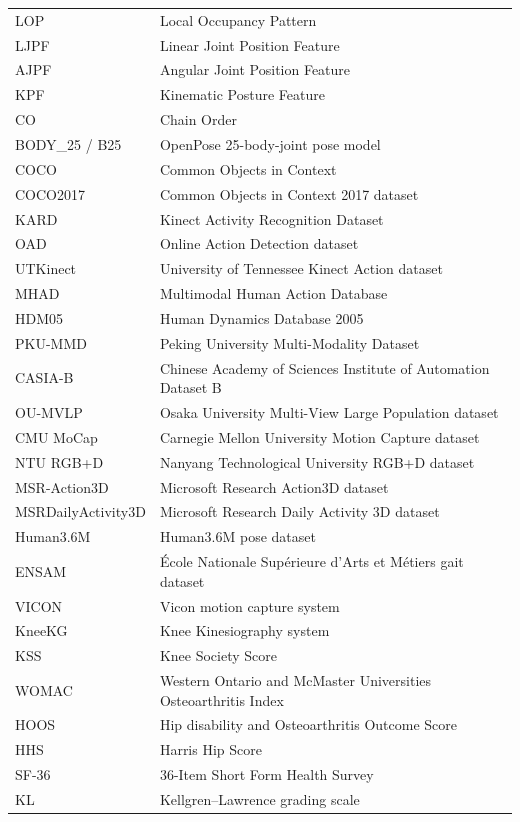 \documentclass[12pt]{elsarticle}
\begin{document}
{\begin{longtable}{p{3cm} p{10.5cm}}
LOP & Local Occupancy Pattern \\
LJPF & Linear Joint Position Feature \\
AJPF & Angular Joint Position Feature \\
KPF & Kinematic Posture Feature \\
CO & Chain Order \\
BODY\_25 / B25 & OpenPose 25-body-joint pose model \\
COCO & Common Objects in Context \\
COCO2017 & Common Objects in Context 2017 dataset \\
KARD & Kinect Activity Recognition Dataset \\
OAD & Online Action Detection dataset \\
UTKinect & University of Tennessee Kinect Action dataset \\
MHAD & Multimodal Human Action Database \\
HDM05 & Human Dynamics Database 2005 \\
PKU-MMD & Peking University Multi-Modality Dataset \\
CASIA-B & Chinese Academy of Sciences Institute of Automation Dataset B \\
OU-MVLP & Osaka University Multi-View Large Population dataset \\
CMU MoCap & Carnegie Mellon University Motion Capture dataset \\
NTU RGB+D & Nanyang Technological University RGB+D dataset \\
MSR-Action3D & Microsoft Research Action3D dataset \\
MSRDailyActivity3D & Microsoft Research Daily Activity 3D dataset \\
Human3.6M & Human3.6M pose dataset \\
ENSAM & \mbox{\'E}cole Nationale Sup\'erieure d'Arts et M\'etiers gait dataset \\
VICON & Vicon motion capture system \\
KneeKG & Knee Kinesiography system \\
KSS & Knee Society Score \\
WOMAC & Western Ontario and McMaster Universities Osteoarthritis Index \\
HOOS & Hip disability and Osteoarthritis Outcome Score \\
HHS & Harris Hip Score \\
SF-36 & 36-Item Short Form Health Survey \\
KL & Kellgren--Lawrence grading scale \\

\end{longtable}}
\end{document}
